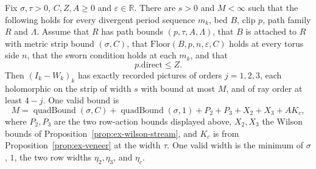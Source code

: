 \begin{proposition}
\label{prop:ex-greyson}
Fix $\sigma,\tau>0$, $C,Z,A\geq0$ and $\varepsilon\in\mathbb R$.
There are $s>0$ and $M<\infty$ such that the following holds for every
divergent period sequence $m_k$, bed $B$, clip $p$, path family $R$ and
$\Lambda$. Assume that $R$ has path bounds $(p,\tau,A,\Lambda)$, that
$B$ is attached to $R$ with metric strip bound $(\sigma,C)$, that
$\mathrm{Floor}(B,p,n,\varepsilon,C)$ holds at every torus side $n$,
that the sworn condition holds at each $m_k$, and that
\[
                    p.\mathrm{direct}\leq Z.
\]
Then $(I_k-W_k)_k$ has exactly recorded pictures of orders $j=1,2,3$,
each holomorphic on the strip of width $s$ with bound at most $M$, and
of ray order at least $4-j$.
One valid bound is
\[
 M=\operatorname{quadBound}(\sigma,C)+\operatorname{quadBound}(\sigma,1)
      +P_2+P_3+X_2+X_3+A K_c,
\]
where $P_2,P_3$ are the two row-action bounds displayed above, $X_2,X_3$
the Wilson bounds of Proposition~\ref{prop:ex-wilson-stream}, and $K_c$
is from Proposition~\ref{prop:ex-veneer} at the width $\tau$. One valid
width is the minimum of $\sigma$, $1$, the two row widths
$\eta_2,\eta_3$, and $\eta_c$.
\end{proposition}

